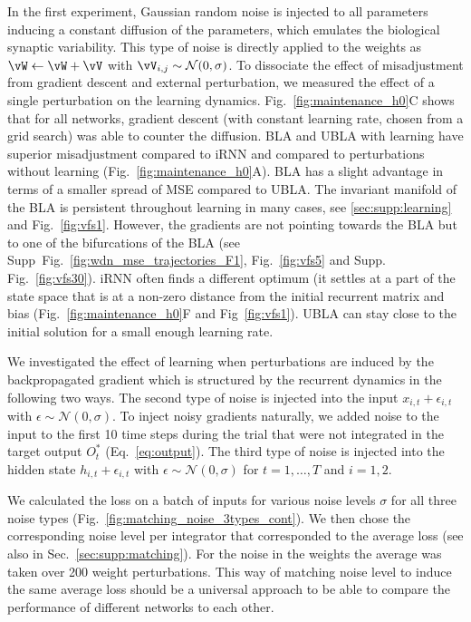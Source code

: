 \documentclass{article} %
\newcounter{ct}
\theoremstyle{definition}
\theoremstyle{remark}
\begin{document}
In the first experiment, Gaussian random noise is injected to all parameters inducing a constant diffusion of the parameters, which emulates the biological synaptic variability.
This type of noise is directly applied to the weights as $ \vW \leftarrow \vW + \vV$ with $\vV_{i,j}\sim\mathcal{N}(0,\sigma)$. To dissociate the effect of misadjustment from gradient descent and external perturbation, we measured the effect of a single perturbation on the learning dynamics.
Fig.~\ref{fig:maintenance_h0}C shows that for all networks, gradient descent (with constant learning rate, chosen from a grid search) was able to counter the diffusion.
BLA and UBLA with learning have superior misadjustment compared to iRNN and compared to perturbations without learning (Fig.~\ref{fig:maintenance_h0}A).
BLA has a slight advantage in terms of a smaller spread of MSE compared to UBLA.
The invariant manifold of the BLA is persistent throughout learning in many cases, see \ref{sec:supp:learning} and Fig.~\ref{fig:vfs1}. However, the gradients are not pointing towards the BLA but to one of the bifurcations of the BLA (see Supp~Fig.~\ref{fig:wdn_mse_trajectories_F1}, Fig.~\ref{fig:vfs5} and Supp. Fig.~\ref{fig:vfs30}).
iRNN often finds a different optimum (it settles at a part of the state space that is at a non-zero distance from the initial recurrent matrix and bias (Fig.~\ref{fig:maintenance_h0}F and Fig~\ref{fig:vfs1}).
UBLA can stay close to the initial solution for a small enough learning rate.

We investigated the effect of learning when perturbations are induced by the backpropagated gradient which is structured by the recurrent dynamics in the following two ways.
The second type of noise is injected into the input $x_{i,t}+\epsilon_{i,t}$ with $\epsilon\sim\mathcal{N}(0,\sigma)$.
To inject noisy gradients naturally, we added noise to the input to the first 10 time steps during the trial that were not integrated in the target output $O_t^*$ (Eq.~\ref{eq:output}).
The third type of noise is injected into the hidden state $h_{i,t}+\epsilon_{i,t}$ with $\epsilon\sim\mathcal{N}(0,\sigma)$ for $t=1,\dots, T$ and $i=1,2$. 

We calculated the loss on a batch of inputs for various noise levels $\sigma$ for all three noise types (Fig.~\ref{fig:matching_noise_3types_cont}).
We then chose the corresponding noise level per integrator that corresponded to the average loss (see also in Sec.~\ref{sec:supp:matching}). For the noise in the weights the average was taken over 200 weight perturbations.
This way of matching noise level to induce the same average loss should be a universal approach to be able to compare the performance of different networks to each other.
\end{document}
